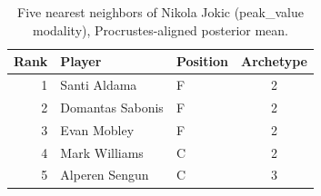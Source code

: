 \begin{table}[htbp]
  \centering\small
  \begin{tabular}{rllc}
    \toprule
    Rank & Player & Position & Archetype \\
    \midrule
    1 & Santi Aldama & F & 2 \\
    2 & Domantas Sabonis & F & 2 \\
    3 & Evan Mobley & F & 2 \\
    4 & Mark Williams & C & 2 \\
    5 & Alperen Sengun & C & 3 \\
    \bottomrule
  \end{tabular}
  \caption{Five nearest neighbors of Nikola Jokic (peak_value modality), Procrustes-aligned posterior mean.}
  \label{tab:Nikola_Jokic_neighbors_peak_value}
\end{table}

